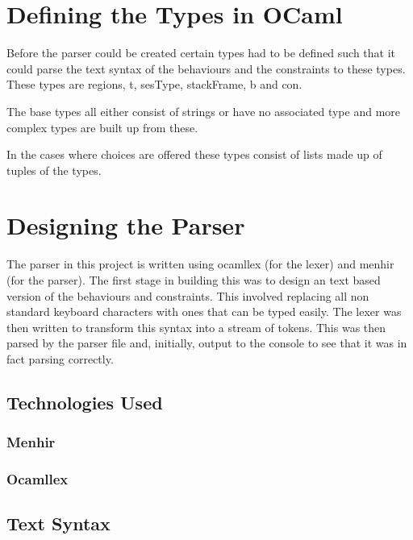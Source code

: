 \documentclass[12pt]{article}
\begin{document}
\maketitle

\section{Defining the Types in OCaml}

Before the parser could be created certain types had to be defined such that it could parse the text syntax of the behaviours and the constraints to these types. These types are regions, t, sesType, stackFrame, b and con. 

The base types all either consist of strings or have no associated type and more complex types are built up from these. 

In the cases where choices are offered these types consist of lists made up of tuples of the types. 

\section {Designing the Parser}

The parser in this project is written using ocamllex (for the lexer) and menhir (for the parser). The first stage in building this was to design an text based version of the behaviours and constraints. This involved replacing all non standard keyboard characters with ones that can be typed easily. The lexer was then written to transform this syntax into a stream of tokens. This was then parsed by the parser file and, initially, output to the console to see that it was in fact parsing correctly. 

\subsection{Technologies Used}
\subsubsection{Menhir}
\subsubsection{Ocamllex}

\subsection{Text Syntax}
\end{document}
